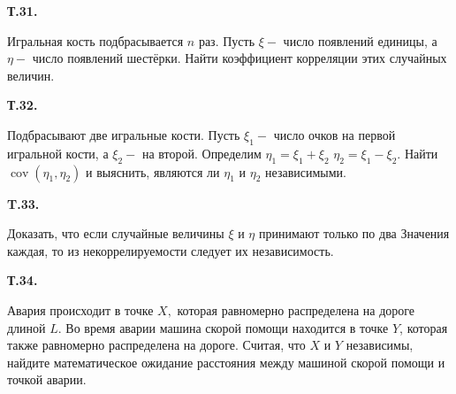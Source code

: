 \documentclass[a4paper,12pt]{article} %
\begin{document}
\begin{example} \textbf{Т.31.} 
	

Игральная кость подбрасывается $n$ раз.
Пусть $\xi-$ число появлений единицы, а $\eta-$ число появлений шестёрки. 
Найти коэффициент корреляции этих случайных величин.







\end{example}



\begin{example} \textbf{Т.32.} 

Подбрасывают две игральные кости. 
Пусть $\xi_{1}-$ число очков на первой игральной кости, а $\xi_{2}-$ на второй. 
Определим $\eta_{1}=\xi_{1}+\xi_{2}$ $\eta_{2}=\xi_{1}-\xi_{2} .$ 
Найти $\operatorname{cov}\left(\eta_{1},\eta_{2}\right)$ и выяснить, являются ли $\eta_{1}$ и $\eta_{2}$ независимыми.





\end{example}



\begin{example}\textbf{T.33. }


Доказать, что если случайные величины $\xi$ и $\eta$ принимают только
по два Значения каждая, то из некоррелируемости следует их независимость.








\end{example}





\begin{example} \textbf{Т.34. }


Авария происходит в точке $X,$ которая равномерно распределена на дороге длиной $L .$ 
Во время аварии машина скорой помощи находится в точке $Y$, которая также равномерно распределена на дороге. 
Считая, что $X$ и $Y$ независимы, найдите математическое ожидание расстояния между машиной скорой помощи и точкой аварии.











\end{example}
\end{document}
